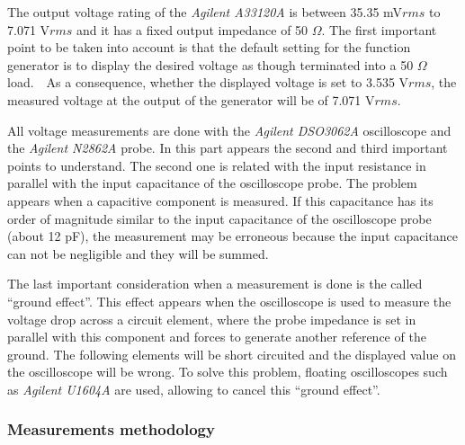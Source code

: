 The output voltage rating of the \textit{Agilent A33120A} is between 35.35 mV$rms$ to 7.071 V$rms$ and it has a fixed output impedance of 50 $\Omega$. The first important point to be taken into account is that the default setting for the function generator is to display the desired voltage as though terminated into a 50 $\Omega$ load.  As a consequence, whether the displayed voltage is set to 3.535 V$rms$, the measured voltage at the output of the generator will be of 7.071 V$rms$.

All voltage measurements are done with the \textit{Agilent DSO3062A} oscilloscope and the \textit{Agilent N2862A} probe. In this part appears the second and third important points to understand. The second one is related with the input resistance in parallel with the input capacitance of the oscilloscope probe. The problem appears when a capacitive component is measured. If this capacitance has its order of magnitude similar to the input capacitance of the oscilloscope probe (about 12 pF), the measurement may be erroneous because the input capacitance can not be negligible and they will be summed.

The last important consideration when a measurement is done is the called ``ground effect''. This effect appears when the oscilloscope is used to measure the voltage drop across a circuit element, where the probe impedance is set in parallel with this component and forces to generate another reference of the ground. The following elements will be short circuited and the displayed value on the oscilloscope will be wrong. To solve this problem, floating oscilloscopes such as \textit{Agilent U1604A} are used, allowing to cancel this ``ground effect''.


		\subsubsection{Measurements methodology}

